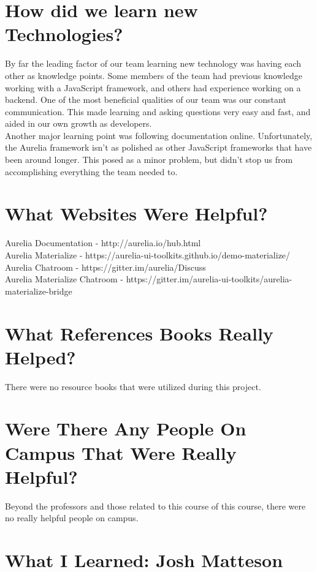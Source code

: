 \documentclass[onecolumn, draftclsnofoot,10pt, compsoc]{IEEEtran}
\begin{document}
\section{How did we learn new Technologies?}

By far the leading factor of our team learning new technology was having each other as knowledge points. Some members of the team had previous knowledge working with a JavaScript framework, and others had experience working on a backend. One of the most beneficial qualities of our team was our constant communication. This made learning and asking questions very easy and fast, and aided in our own growth as developers. \\ 

\noindent Another major learning point was following documentation online. Unfortunately, the Aurelia framework isn't as polished as other JavaScript frameworks that have been around longer. This posed as a minor problem, but didn't stop us from accomplishing everything the team needed to. \\

\section{What Websites Were Helpful?}
Aurelia Documentation - http://aurelia.io/hub.html \\
Aurelia Materialize - https://aurelia-ui-toolkits.github.io/demo-materialize/ \\
Aurelia Chatroom - https://gitter.im/aurelia/Discuss \\
Aurelia Materialize Chatroom - https://gitter.im/aurelia-ui-toolkits/aurelia-materialize-bridge
	
\section{What References Books Really Helped?}
There were no resource books that were utilized during this project.

\section{Were There Any People On Campus That Were Really Helpful?}
Beyond the professors and those related to this course of this course, there were no really helpful people on campus.

\newpage
\section{What I Learned: Josh Matteson}
\end{document}
